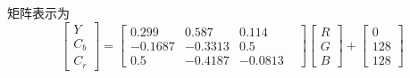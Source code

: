 矩阵表示为
\begin{equation}
    \begin{bmatrix}
        Y \\ C_b \\ C_r
    \end{bmatrix}
    =\begin{bmatrix}
        0.299   & 0.587    & 0.114 & \\
        -0.1687 & -0.3313   & 0.5 & \\
        0.5     & -0.4187   & -0.0813 &
    \end{bmatrix}
    \begin{bmatrix}
        R \\ G \\ B
    \end{bmatrix}
    +\begin{bmatrix}
        0 \\ 128 \\ 128
    \end{bmatrix}
\end{equation}


